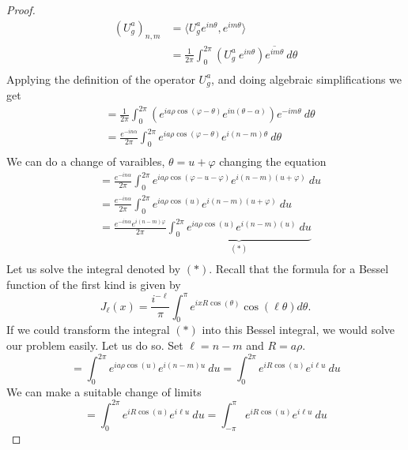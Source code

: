 \documentclass{article}
\begin{document}
\begin{proof}
    \[%
        \begin{split}
            \left(U^{a}_{g}\right)_{n,m} 
            &= \langle  U^{a}_{g} e^{in\theta} , e^{im\theta} \rangle \\
            &= \frac{1}{2\pi} \int^{2\pi}_{0} \left(U^{a}_{g} \ e^{in\theta}\right) \overline{e^{im\theta}} \ d\theta \\
        \end{split}
    \]%
    Applying the definition of the operator $U^{a}_{g}$, and doing algebraic simplifications we get
    \[%
        \begin{split}
            &= \frac{1}{2\pi} \int^{2\pi}_{0} \left(e^{ia \rho \cos\left(\varphi - \theta \right)} e^{in(\theta-\alpha)}\right) {e^{-im\theta}} \ d\theta \\
            &= \frac{e^{-in\alpha}}{2\pi} \int^{2\pi}_{0} e^{ia\rho \cos\left(\varphi - \theta\right)}e^{i (n-m)\theta} \ d\theta \\
        \end{split}
    \]%
    We can do a change of varaibles, $\theta= u +\varphi$ changing the equation
    \[%
        \begin{split}
            &= \frac{e^{-in\alpha}}{2\pi} \int^{2\pi}_{0} e^{ia\rho \cos\left(\varphi-u-\varphi\right)}e^{i (n-m)(u+\varphi)} \ du\\
            &= \frac{e^{-in\alpha}}{2\pi} \int^{2\pi}_{0} e^{ia\rho \cos\left(u\right)}e^{i (n-m)(u+\varphi)} \ du\\
            &= \frac{e^{-in\alpha} e^{i(n-m)\varphi}}{2\pi} \underbrace{\int^{2\pi}_{0} e^{ia\rho \cos\left(u\right)}e^{i (n-m)(u)} \ du}_{(*)} \\
        \end{split}
    \]%
    Let us solve the integral denoted by $(*)$. Recall that the formula for a Bessel function of the first kind is given by
    \[%
        J_{\ell}(x) = \frac{i^{- \ell}}{\pi} \int^{\pi}_{0} e^{i x R \cos\left(\theta\right)} \cos\left(\ell\theta\right) d\theta
    .\]%
    If we could transform the integral $(*)$ into this Bessel integral, we would solve our problem easily. Let us do so. Set $\ell = n-m$ and $R = a\rho$.
    \[%
            = \int^{2\pi}_{0} e^{ia\rho \cos\left(u\right)} e^{i (n-m)u} \ du = \int^{2\pi}_{0} e^{iR \cos\left(u\right)} e^{i \ell u} \ du
    \]%
    We can make a suitable change of limits
    \[%
         = \int^{2\pi}_{0} e^{iR \cos\left(u\right)} e^{i \ell u} \ du = \int^{\pi}_{-\pi} e^{iR \cos\left(u\right)} e^{i \ell u} \ du
\]
\end{proof}
\end{document}
